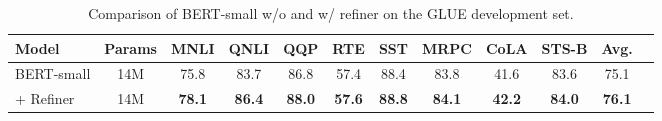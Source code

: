 \begin{table*}[h]
\caption{\small Comparison of BERT-small w/o and w/ refiner   on the GLUE development set. }
\vspace{-2mm}
\label{tab:gluetest}
\footnotesize
\begin{center}
\small
\begin{tabular}{l c c c c c c c c c c c}
\toprule
 Model  & Params & MNLI & QNLI & QQP & RTE & SST & MRPC & CoLA & STS-B & Avg.\\ [0.5ex] 
\midrule
BERT-small \cite{clark2020electra}  & 14M & 75.8 & 83.7 & 86.8 & 57.4 & 88.4 & 83.8 & 41.6 & 83.6 & 75.1 \\ 
\quad + Refiner   & 14M & \textbf{78.1} & \textbf{86.4} & \textbf{88.0} & \textbf{57.6} & \textbf{88.8} & \textbf{84.1} & \textbf{42.2} & \textbf{84.0} & \textbf{76.1}\\
\bottomrule

\end{tabular}

\end{center}
\vspace{-2mm}
\end{table*}

